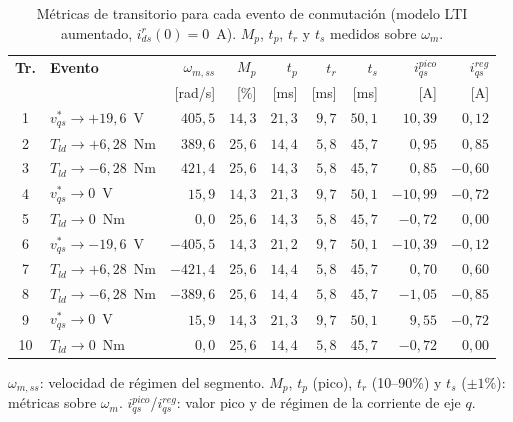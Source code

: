 \documentclass[12pt, a4paper,journal, onecolumn, compsoc]{IEEEtran}
\begin{document}
\begin{table}[H]
    \centering
    \caption{Métricas de transitorio para cada evento de conmutación (modelo LTI aumentado, $i_{ds}^r(0) = 0$~A). $M_p$, $t_p$, $t_r$ y $t_s$ medidos sobre $\omega_m$.}
    \label{tab:metricas_trans}
    \renewcommand{\arraystretch}{1.15}
    \scriptsize
    \begin{tabular}{|c|l|r|r|r|r|r|r|r|}
        \hline
        \textbf{Tr.} & \textbf{Evento} & $\omega_{m,ss}$ & $M_p$ & $t_p$ & $t_r$ & $t_s$ & $i_{qs}^{pico}$ & $i_{qs}^{reg}$ \\
         & & [rad/s] & [\%] & [ms] & [ms] & [ms] & [A] & [A] \\
        \hline
        1  & $v_{qs}^* \to +19{,}6$~V & $405{,}5$ & $14{,}3$ & $21{,}3$ & $9{,}7$ & $50{,}1$ & $10{,}39$ & $0{,}12$ \\
        2  & $T_{ld} \to +6{,}28$~Nm & $389{,}6$ & $25{,}6$ & $14{,}4$ & $5{,}8$ & $45{,}7$ & $0{,}95$ & $0{,}85$ \\
        3  & $T_{ld} \to -6{,}28$~Nm & $421{,}4$ & $25{,}6$ & $14{,}3$ & $5{,}8$ & $45{,}7$ & $0{,}85$ & $-0{,}60$ \\
        4  & $v_{qs}^* \to 0$~V & $15{,}9$ & $14{,}3$ & $21{,}3$ & $9{,}7$ & $50{,}1$ & $-10{,}99$ & $-0{,}72$ \\
        5  & $T_{ld} \to 0$~Nm & $0{,}0$ & $25{,}6$ & $14{,}3$ & $5{,}8$ & $45{,}7$ & $-0{,}72$ & $0{,}00$ \\
        6  & $v_{qs}^* \to -19{,}6$~V & $-405{,}5$ & $14{,}3$ & $21{,}2$ & $9{,}7$ & $50{,}1$ & $-10{,}39$ & $-0{,}12$ \\
        7  & $T_{ld} \to +6{,}28$~Nm & $-421{,}4$ & $25{,}6$ & $14{,}4$ & $5{,}8$ & $45{,}7$ & $0{,}70$ & $0{,}60$ \\
        8  & $T_{ld} \to -6{,}28$~Nm & $-389{,}6$ & $25{,}6$ & $14{,}4$ & $5{,}8$ & $45{,}7$ & $-1{,}05$ & $-0{,}85$ \\
        9  & $v_{qs}^* \to 0$~V & $15{,}9$ & $14{,}3$ & $21{,}3$ & $9{,}7$ & $50{,}1$ & $9{,}55$ & $-0{,}72$ \\
        10 & $T_{ld} \to 0$~Nm & $0{,}0$ & $25{,}6$ & $14{,}4$ & $5{,}8$ & $45{,}7$ & $-0{,}72$ & $0{,}00$ \\
        \hline
    \end{tabular}

    \vspace{2mm}
    \scriptsize $\omega_{m,ss}$: velocidad de régimen del segmento. $M_p$, $t_p$ (pico), $t_r$ (10--90\%) y $t_s$ ($\pm1\%$): métricas sobre $\omega_m$. $i_{qs}^{pico}$/$i_{qs}^{reg}$: valor pico y de régimen de la corriente de eje $q$.
\end{table}
\end{document}
